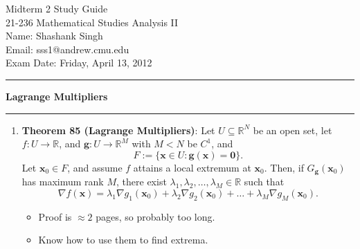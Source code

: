 \documentclass[11pt]{article}
\makeatletter
\newcommand{\myname}{Shashank Singh}
\newcommand{\myandrew}{sss1@andrew.cmu.edu}
\newcommand{\myclass}{21-236 Mathematical Studies Analysis II}
\newcommand{\duedate}{Friday, April 13, 2012}
\makeatother
\begin{document}
\thispagestyle{plain}

{\Large Midterm 2 Study Guide} \\
\myclass \\
Name: \myname \\
Email: \myandrew \\
Exam Date: \duedate \\

\hrule
{\Large \bf Lagrange Multipliers}
\vspace{1mm}
\hrule
\begin{enumerate}
\item \textbf{Theorem 85 (Lagrange Multipliers)}: Let
$U \subseteq \mathbb{R}^N$ be an open set, let $f: U \rightarrow \mathbb{R}$,
and $\mathbf{g}: U \rightarrow \mathbb{R}^M$ with $M < N$ be $C^1$, and
\[F := \{\mathbf{x} \in U : \mathbf{g}(\mathbf{x}) = \mathbf{0}\}.\]
Let $\mathbf{x}_0 \in F$, and assume $f$ attains a local extremum at
$\mathbf{x}_0$. Then, if $G_{\mathbf{g}}(\mathbf{x}_0)$ has maximum rank $M$,
there exist $\lambda_1,\lambda_2,\ldots,\lambda_M \in \mathbb{R}$ such that
\[\nabla f(\mathbf{x})
 = \lambda_1 \nabla g_1(\mathbf{x}_0) + \lambda_2 \nabla g_2(\mathbf{x}_0)
 + \ldots + \lambda_M \nabla g_M(\mathbf{x}_0).
\]
\begin{itemize}
\item Proof is $\approx 2$ pages, so probably too long.
\item Know how to use them to find extrema.
\end{itemize}
\end{enumerate}
\end{document}
